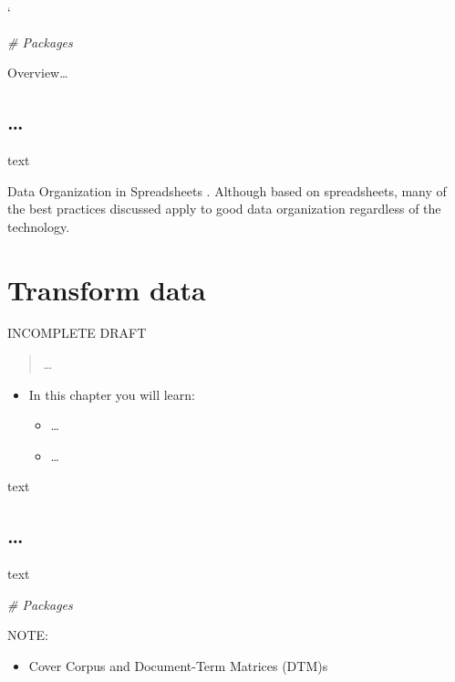 \documentclass[
]{article}
\newenvironment{Shaded}{\begin{snugshade}}{\end{snugshade}}
\newcommand{\CommentTok}[1]{\textcolor[rgb]{0.56,0.35,0.01}{\textit{#1}}}
\providecommand{\tightlist}{%
  \setlength{\itemsep}{0pt}\setlength{\parskip}{0pt}}
\newenvironment{rmdblock}[1]
  {\begin{shaded*}
  \begin{itemize}
  \renewcommand{\labelitemi}{
    \raisebox{-.5\height}[0pt][0pt]{
      {\setkeys{Gin}{width=2em,keepaspectratio}\texttt{[image: assets/images/\#1]}}
    }
  }
  \item
  }
  {
  \end{itemize}
  \end{shaded*}
  }
\newenvironment{rmdkey}
  {\begin{rmdblock}{key}}
  {\end{rmdblock}}
\begin{document}
`

\begin{Shaded}
\begin{Highlighting}[]
\CommentTok{\# Packages}
\end{Highlighting}
\end{Shaded}

Overview\ldots{}

\hypertarget{section-1}{%
\subsection{\ldots{}}\label{section-1}}

text

Data Organization in Spreadsheets \citep{Broman2018}. Although based on spreadsheets, many of the best practices discussed apply to good data organization regardless of the technology.

\hypertarget{transform-data}{%
\section{Transform data}\label{transform-data}}

INCOMPLETE DRAFT

\begin{quote}
\ldots{}
\end{quote}

\begin{rmdkey}
In this chapter you will learn:

\begin{itemize}
\tightlist
\item
  \ldots{}
\item
  \ldots{}
\end{itemize}
\end{rmdkey}

text

\hypertarget{section-2}{%
\subsection{\ldots{}}\label{section-2}}

text

\begin{Shaded}
\begin{Highlighting}[]
\CommentTok{\# Packages}
\end{Highlighting}
\end{Shaded}

NOTE:

\begin{itemize}
\tightlist
\item
  Cover Corpus and Document-Term Matrices (DTM)s
\end{itemize}
\end{document}
